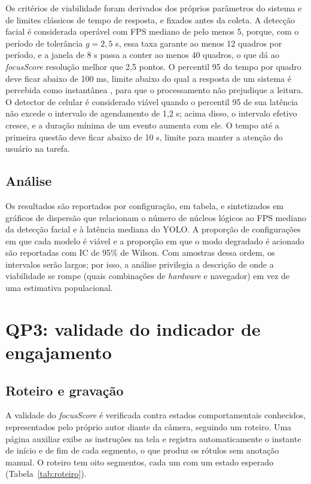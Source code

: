 \documentclass[portuguese,oneside]{tcc}
\newcommand{\estr}[1]{\emph{#1}}
\newcommand{\fs}{\emph{focusScore}\xspace}
\begin{document}
Os critérios de viabilidade foram derivados dos próprios parâmetros do sistema e de limites clássicos de tempo de resposta, e fixados antes da coleta. A detecção facial é considerada operável com FPS mediano de pelo menos 5, porque, com o período de tolerância $g = 2{,}5$ s, essa taxa garante ao menos 12 quadros por período, e a janela de 8 s passa a conter ao menos 40 quadros, o que dá ao \fs resolução melhor que 2,5 pontos. O percentil 95 do tempo por quadro deve ficar abaixo de 100 ms, limite abaixo do qual a resposta de um sistema é percebida como instantânea \cite{Nie93}, para que o processamento não prejudique a leitura. O detector de celular é considerado viável quando o percentil 95 de sua latência não excede o intervalo de agendamento de 1,2 s; acima disso, o intervalo efetivo cresce, e a duração mínima de um evento aumenta com ele. O tempo até a primeira questão deve ficar abaixo de 10 s, limite para manter a atenção do usuário na tarefa.

\subsection{Análise}

Os resultados são reportados por configuração, em tabela, e sintetizados em gráficos de dispersão que relacionam o número de núcleos lógicos ao FPS mediano da detecção facial e à latência mediana do YOLO. A proporção de configurações em que cada modelo é viável e a proporção em que o modo degradado é acionado são reportadas com IC de 95\% de Wilson. Com amostras dessa ordem, os intervalos serão largos; por isso, a análise privilegia a descrição de onde a viabilidade se rompe (quais combinações de \estr{hardware} e navegador) em vez de uma estimativa populacional.

\section{\label{sec:met-qp3}QP3: validade do indicador de engajamento}

\subsection{Roteiro e gravação}

A validade do \fs é verificada contra estados comportamentais conhecidos, representados pelo próprio autor diante da câmera, seguindo um roteiro. Uma página auxiliar exibe as instruções na tela e registra automaticamente o instante de início e de fim de cada segmento, o que produz os rótulos sem anotação manual. O roteiro tem oito segmentos, cada um com um estado esperado (Tabela~\ref{tab:roteiro}).
\end{document}
